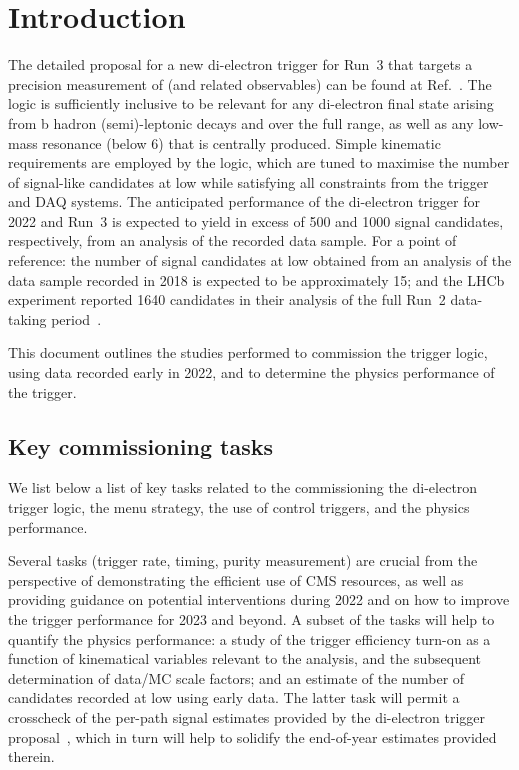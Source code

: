 \clearpage
\section{Introduction}

The detailed proposal for a new di-electron trigger for Run~3 that
targets a precision measurement of \rk (and related observables) can
be found at Ref.~\cite{AN-21-160}. The logic is sufficiently inclusive
to be relevant for any di-electron final state arising from b hadron
(semi)-leptonic decays and over the full \qsq range, as well as any
low-mass resonance (below 6\GeV) that is centrally produced. Simple
kinematic requirements are employed by the logic, which are tuned to
maximise the number of signal-like \bkee candidates at low \qsq while
satisfying all constraints from the trigger and DAQ systems. The
anticipated performance of the di-electron trigger for 2022 and Run~3
is expected to yield in excess of 500 and 1000 signal candidates,
respectively, from an analysis of the recorded data sample. For a
point of reference: the number of \bkee signal candidates at low \qsq
obtained from an analysis of the \bparking data sample recorded in
2018 is expected to be approximately 15; and the LHCb experiment
reported 1640 candidates in their analysis of the full Run~2
data-taking period~\cite{LHCb:2021trn}.

This document outlines the studies performed to commission the trigger
logic, using data recorded early in 2022, and to determine the physics
performance of the trigger.

\subsection{Key commissioning tasks}

We list below a list of key tasks related to the commissioning the
di-electron trigger logic, the menu strategy, the use of control
triggers, and the physics performance.

Several tasks (\eg trigger rate, timing, purity measurement) are
crucial from the perspective of demonstrating the efficient use of CMS
resources, as well as providing guidance on potential interventions
during 2022 and on how to improve the trigger performance for 2023 and
beyond. A subset of the tasks will help to quantify the physics
performance: a study of the trigger efficiency turn-on as a function
of kinematical variables relevant to the analysis, and the subsequent
determination of data/MC scale factors; and an estimate of the number
of candidates recorded at low \qsq using early data. The latter task
will permit a crosscheck of the per-path signal \axe estimates
provided by the di-electron trigger proposal~\cite{AN-21-160}, which
in turn will help to solidify the end-of-year estimates provided
therein.

